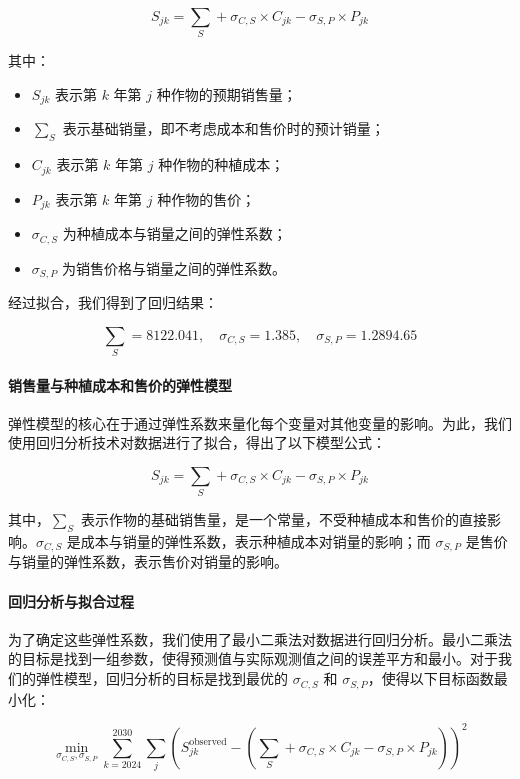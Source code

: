 \documentclass[12pt,a4paper]{nmmcm}
\begin{document}
\[
  S_{jk} = \sum_S + \sigma_{C,S} \times C_{jk} - \sigma_{S,P} \times P_{jk}
\]

其中：
\begin{itemize}
  \item $S_{jk}$ 表示第 $k$ 年第 $j$ 种作物的预期销售量；
  \item $\sum_S$ 表示基础销量，即不考虑成本和售价时的预计销量；
  \item $C_{jk}$ 表示第 $k$ 年第 $j$ 种作物的种植成本；
  \item $P_{jk}$ 表示第 $k$ 年第 $j$ 种作物的售价；
  \item $\sigma_{C,S}$ 为种植成本与销量之间的弹性系数；
  \item $\sigma_{S,P}$ 为销售价格与销量之间的弹性系数。
\end{itemize}

经过拟合，我们得到了回归结果：

\[
  \sum_S = 8122.041, \quad \sigma_{C,S} = 1.385, \quad \sigma_{S,P} = 1.2894.65
\]

\paragraph{销售量与种植成本和售价的弹性模型}

弹性模型的核心在于通过弹性系数来量化每个变量对其他变量的影响。为此，我们使用回归分析技术对数据进行了拟合，得出了以下模型公式：

\[
  S_{jk} = \sum_S + \sigma_{C,S} \times C_{jk} - \sigma_{S,P} \times P_{jk}
\]

其中，$\sum_S$ 表示作物的基础销售量，是一个常量，不受种植成本和售价的直接影响。$\sigma_{C,S}$ 是成本与销量的弹性系数，表示种植成本对销量的影响；而 $\sigma_{S,P}$ 是售价与销量的弹性系数，表示售价对销量的影响。

\paragraph{回归分析与拟合过程}

为了确定这些弹性系数，我们使用了最小二乘法对数据进行回归分析。最小二乘法的目标是找到一组参数，使得预测值与实际观测值之间的误差平方和最小。对于我们的弹性模型，回归分析的目标是找到最优的 $\sigma_{C,S}$ 和 $\sigma_{S,P}$，使得以下目标函数最小化：

\[
  \min_{\sigma_{C,S}, \sigma_{S,P}} \sum_{k=2024}^{2030} \sum_{j} \left( S_{jk}^{\text{observed}} - \left( \sum_S + \sigma_{C,S} \times C_{jk} - \sigma_{S,P} \times P_{jk} \right) \right)^2
\]
\end{document}
